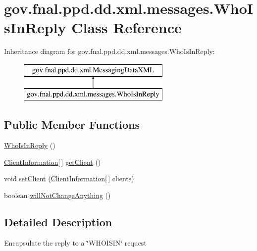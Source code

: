 \hypertarget{classgov_1_1fnal_1_1ppd_1_1dd_1_1xml_1_1messages_1_1WhoIsInReply}{\section{gov.\-fnal.\-ppd.\-dd.\-xml.\-messages.\-Who\-Is\-In\-Reply Class Reference}
\label{classgov_1_1fnal_1_1ppd_1_1dd_1_1xml_1_1messages_1_1WhoIsInReply}
}
Inheritance diagram for gov.\-fnal.\-ppd.\-dd.\-xml.\-messages.\-Who\-Is\-In\-Reply\-:\begin{figure}[H]
\begin{center}
\leavevmode
\includegraphics[height=2.000000cm]{classgov_1_1fnal_1_1ppd_1_1dd_1_1xml_1_1messages_1_1WhoIsInReply}
\end{center}
\end{figure}
\subsection*{Public Member Functions}
\begin{DoxyCompactItemize}
\item 
\hyperlink{classgov_1_1fnal_1_1ppd_1_1dd_1_1xml_1_1messages_1_1WhoIsInReply_adba46f4b9c40c22f08dfc1382d47253f}{Who\-Is\-In\-Reply} ()
\item 
\hyperlink{classgov_1_1fnal_1_1ppd_1_1dd_1_1xml_1_1ClientInformation}{Client\-Information}\mbox{[}$\,$\mbox{]} \hyperlink{classgov_1_1fnal_1_1ppd_1_1dd_1_1xml_1_1messages_1_1WhoIsInReply_a15b5225293c790047d9927cdc25bd8b2}{get\-Client} ()
\item 
void \hyperlink{classgov_1_1fnal_1_1ppd_1_1dd_1_1xml_1_1messages_1_1WhoIsInReply_a20ffd58b7a96884c4ea7987be4d6cdc3}{set\-Client} (\hyperlink{classgov_1_1fnal_1_1ppd_1_1dd_1_1xml_1_1ClientInformation}{Client\-Information}\mbox{[}$\,$\mbox{]} clients)
\item 
boolean \hyperlink{classgov_1_1fnal_1_1ppd_1_1dd_1_1xml_1_1messages_1_1WhoIsInReply_a335779f93e5c08584605cb8c7ab0108e}{will\-Not\-Change\-Anything} ()
\end{DoxyCompactItemize}


\subsection{Detailed Description}
Encapsulate the reply to a \char`\"{}\-W\-H\-O\-I\-S\-I\-N\char`\"{} request


